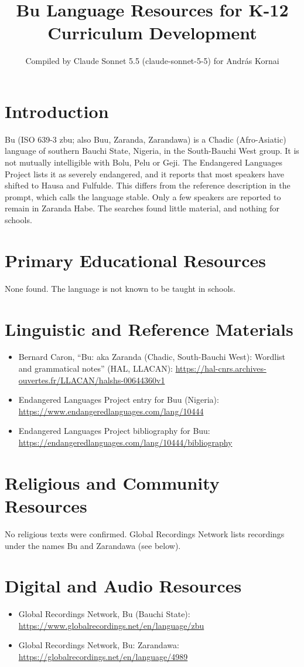 \documentclass[12pt]{article}
\title{Bu Language Resources for K-12 Curriculum Development}
\author{Compiled by Claude Sonnet 5.5 (claude-sonnet-5-5) for Andr\'as Kornai}
\date{}
\begin{document}
\maketitle

\section{Introduction}
Bu (ISO 639-3 zbu; also Buu, Zaranda, Zarandawa) is a Chadic (Afro-Asiatic) language of southern Bauchi State, Nigeria, in the South-Bauchi West group. It is not mutually intelligible with Bolu, Pelu or Geji. The Endangered Languages Project lists it as severely endangered, and it reports that most speakers have shifted to Hausa and Fulfulde. This differs from the reference description in the prompt, which calls the language stable. Only a few speakers are reported to remain in Zaranda Habe. The searches found little material, and nothing for schools.

\section{Primary Educational Resources}
None found. The language is not known to be taught in schools.

\section{Linguistic and Reference Materials}
\begin{itemize}
\item Bernard Caron, ``Bu: aka Zaranda (Chadic, South-Bauchi West): Wordlist and grammatical notes'' (HAL, LLACAN): \url{https://hal-cnrs.archives-ouvertes.fr/LLACAN/halshs-00644360v1}
\item Endangered Languages Project entry for Buu (Nigeria): \url{https://www.endangeredlanguages.com/lang/10444}
\item Endangered Languages Project bibliography for Buu: \url{https://endangeredlanguages.com/lang/10444/bibliography}
\end{itemize}

\section{Religious and Community Resources}
No religious texts were confirmed. Global Recordings Network lists recordings under the names Bu and Zarandawa (see below).

\section{Digital and Audio Resources}
\begin{itemize}
\item Global Recordings Network, Bu (Bauchi State): \url{https://www.globalrecordings.net/en/language/zbu}
\item Global Recordings Network, Bu: Zarandawa: \url{https://globalrecordings.net/en/language/4989}
\end{itemize}
\end{document}
